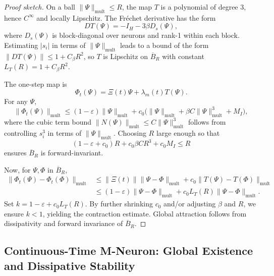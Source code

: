 \documentclass[11pt]{article}
\begin{document}
\begin{proof}[Proof sketch]
On a ball \(\|\Psi\|_{\mathrm{mult}}\le R\), the map \(T\) is a polynomial of degree 3, hence \(C^\infty\) and locally Lipschitz.
The Fréchet derivative has the form
\[
DT(\Psi) = -I_H - 3\beta D_s(\Psi),
\]
where \(D_s(\Psi)\) is block-diagonal over neurons and rank-1 within each block.
Estimating \(|s_i|\) in terms of \(\|\Psi\|_{\mathrm{mult}}\) leads to a bound of the form
\(\|DT(\Psi)\|\le 1 + C_\beta R^2\), so \(T\) is Lipschitz on \(\overline{B}_R\) with constant
\(L_T(R) = 1 + C_\beta R^2\).

The one-step map is
\[
\Phi_t(\Psi) = \Xi(t)\Psi + \lambda_m(t)T(\Psi).
\]
For any \(\Psi\),
\[
\|\Phi_t(\Psi)\|_{\mathrm{mult}}
\le (1-\varepsilon)\|\Psi\|_{\mathrm{mult}} + c_0\bigl(\|\Psi\|_{\mathrm{mult}} + \beta C \|\Psi\|_{\mathrm{mult}}^3 + M_I\bigr),
\]
where the cubic term bound \(\|N(\Psi)\|_{\mathrm{mult}}\le C\|\Psi\|_{\mathrm{mult}}^3\) follows from controlling \(s_i^3\) in terms of \(\|\Psi\|_{\mathrm{mult}}\).
Choosing \(R\) large enough so that
\[
(1-\varepsilon + c_0)R + c_0\beta C R^3 + c_0 M_I \le R
\]
ensures \(\overline{B}_R\) is forward-invariant.

Now, for \(\Psi,\Phi\) in \(\overline{B}_R\),
\[
\begin{aligned}
\|\Phi_t(\Psi) - \Phi_t(\Phi)\|_{\mathrm{mult}}
&\le \|\Xi(t)\|\|\Psi-\Phi\|_{\mathrm{mult}}
+ c_0 \|T(\Psi) - T(\Phi)\|_{\mathrm{mult}} \\
&\le (1-\varepsilon)\|\Psi-\Phi\|_{\mathrm{mult}}
+ c_0 L_T(R)\|\Psi-\Phi\|_{\mathrm{mult}}.
\end{aligned}
\]
Set \(k = 1-\varepsilon + c_0 L_T(R)\).
By further shrinking \(c_0\) and/or adjusting \(\beta\) and \(R\), we ensure \(k < 1\), yielding the contraction estimate.
Global attraction follows from dissipativity and forward invariance of \(\overline{B}_R\).
\end{proof}

\subsection{Continuous-Time M-Neuron: Global Existence and Dissipative Stability}
\end{document}
